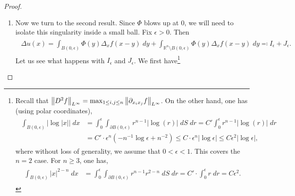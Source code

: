 \documentclass{article}
\begin{document}
\begin{itemize}
\begin{proof}
\begin{enumerate}[itemsep=-2pt,label = (\arabic{*})]
				\item Now we turn to the second result. Since $\Phi$ blows up at 0, we will need to isolate this singularity inside a small ball. Fix $\epsilon > 0$. Then 
				\begin{align*}
					\begin{split}
						\Delta u(x) = \int_{B(0,\epsilon)}\Phi(y)\Delta_{x}f(x-y)\;dy + \int_{\mathbb{R}^{n}\setminus B(0,\epsilon)}\Phi(y)\Delta_{x}f(x-y)\;dy \eqqcolon I_{\epsilon} + J_{\epsilon}. 
					\end{split}
				\end{align*}
				Let us see what happens with $I_{\epsilon}$ and $J_{\epsilon}$. We first have\footnote{Recall that $\left\Vert D^{2}f \right\Vert_{L^{\infty}} = \max_{1 \leq i, j \leq n}\left\Vert \partial_{x_{i}x_{j}}f \right\Vert_{L^\infty}$. On the other hand, one has (using polar coordinates), 
					\begin{align*}
						\begin{split}
							\int_{B(0,\epsilon)}|\log|x||\;dx &= \int_{0}^{\epsilon}\int_{\partial B(0,\epsilon)}r^{n-1}|\log(r)|\;dS\;dr = C' \int_{0}^{\epsilon}r^{n-1}|\log(r)|\;dr \\
							&= C' \cdot \epsilon^{n}(-n^{-1}\log{\epsilon} + n^{-2}) \leq C \cdot \epsilon^{n}|\log{\epsilon}| \leq C \epsilon^{2}|\log{\epsilon}|, 
						\end{split}
					\end{align*}
					where without loss of generality, we assume that $0 < \epsilon < 1$. This covers the $n = 2$ case. For $n \geq 3$, one has, 
					\begin{align*}
						\begin{split}
							\int_{B(0,\epsilon)}|x|^{2-n}\;dx &= \int_{0}^{\epsilon}\int_{\partial B(0,\epsilon)}r^{n-1}r^{2-n}\;dS\;dr = C' \cdot \int_{0}^{\epsilon}r\;dr = C \epsilon^{2}. 
						\end{split}
					\end{align*}
					
}
\end{enumerate}
\end{proof}
\end{itemize}
\end{document}
